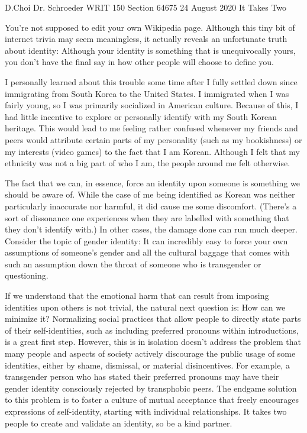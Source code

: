 \documentclass[12pt, letterpaper]{article}
\begin{document}
\begin{mla}
	{D.}{Choi}
	{Dr. Schroeder}
	{WRIT 150 Section 64675}
	{24 August 2020}
	{It Takes Two}


You're not supposed to edit your own Wikipedia page. Although this tiny bit
of internet trivia may seem meaningless, it actually reveals an unfortunate
truth about identity: Although your identity is something that is
unequivocally yours, you don't have the final say in how other people will
choose to define you.

I personally learned about this trouble some time after I fully settled down
since immigrating from South Korea to the United States. I immigrated when I
was fairly young, so I was primarily socialized in American culture. Because
of this, I had little incentive to explore or personally identify with my
South Korean heritage. This would lead to me feeling rather confused whenever
my friends and peers would attribute certain parts of my personality (such as
my bookishness) or my interests (video games) to the fact that I am Korean.
Although I felt that my ethnicity was not a big part of who I am, the people
around me felt otherwise.

The fact that we can, in essence, force an identity upon someone is something
we should be aware of. While the case of me being identified as Korean was
neither particularly inaccurate nor harmful, it did cause me some discomfort.
(There's a sort of dissonance one experiences when they are labelled with
something that they don't identify with.) In other cases, the damage done can
run much deeper. Consider the topic of gender identity: It can incredibly easy
to force your own assumptions of someone's gender and all the cultural baggage
that comes with such an assumption down the throat of someone who is
transgender or questioning.

If we understand that the emotional harm that can result from imposing
identities upon others is not trivial, the natural next question is: How can
we minimize it? Normalizing social practices that allow people to directly
state parts of their self-identities, such as including preferred pronouns
within introductions, is a great first step. However, this is in isolation
doesn't address the problem that many people and aspects of society actively
discourage the public usage of some identities, either by shame, dismissal, or
material disincentives. For example, a transgender person who has stated their
preferred pronouns may have their gender identity consciously rejected by 
transphobic peers. The endgame solution to this problem is to foster a culture
of mutual acceptance that freely encourages expressions of self-identity,
starting with individual relationships. It takes two people to create and
validate an identity, so be a kind partner.

\end{mla}
\end{document}
